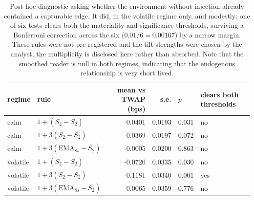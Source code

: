 \begin{table}[htbp]\centering
\caption{Post-hoc diagnostic asking whether the environment without injection already
contained a capturable edge. It did, in the volatile regime only, and modestly: one of
six tests clears both the materiality and significance thresholds, surviving a
Bonferroni correction across the six ($0.01/6=0.00167$) by a narrow margin. These rules
were not pre-registered and the tilt strengths were chosen by the analyst; the
multiplicity is disclosed here rather than absorbed. Note that the smoothed reader is
null in both regimes, indicating that the endogenous relationship is very short lived.}
\label{tab:sigext-base-env}
\small
\begin{tabular}{llrrll}
\toprule
regime & rule & mean vs TWAP (bps) & s.e. & $p$ & clears both thresholds \\
\midrule
calm & $1+(S_2-\bar{S_2})$ & -0.0401 & 0.0193 & 0.031 & no \\
calm & $1+3(S_2-\bar{S_2})$ & -0.0369 & 0.0197 & 0.072 & no \\
calm & $1+3(\mathrm{EMA}_{8s}-\bar{S_2})$ & -0.0005 & 0.0200 & 0.863 & no \\
volatile & $1+(S_2-\bar{S_2})$ & -0.0720 & 0.0335 & 0.030 & no \\
volatile & $1+3(S_2-\bar{S_2})$ & -0.1181 & 0.0340 & 0.001 & yes \\
volatile & $1+3(\mathrm{EMA}_{8s}-\bar{S_2})$ & -0.0065 & 0.0359 & 0.776 & no \\
\bottomrule
\end{tabular}
\end{table}
